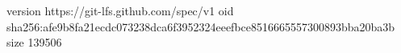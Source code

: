 version https://git-lfs.github.com/spec/v1
oid sha256:afe9b8fa21ecdc073238dca6f3952324eeefbce8516665557300893bba20ba3b
size 139506
